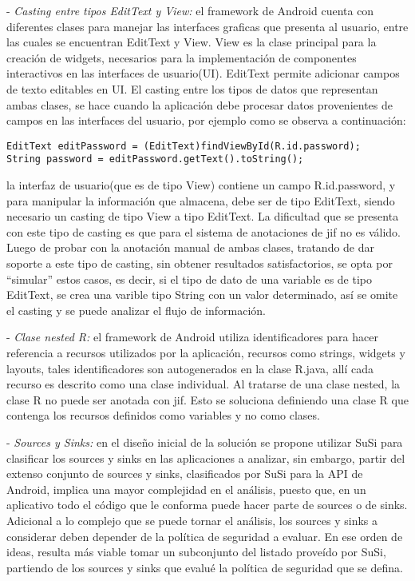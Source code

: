 - \textit{Casting entre tipos EditText y View:}\newline
el framework de Android cuenta con diferentes clases para manejar las interfaces
graficas que presenta al usuario, entre las cuales se encuentran EditText y
View. View es la clase principal para la creación de widgets, necesarios para la
implementación de componentes interactivos en las interfaces de usuario(UI).
EditText permite adicionar campos de texto editables en UI. El casting entre los
tipos de datos que representan ambas clases, se hace cuando la aplicación debe
procesar datos provenientes de campos en las interfaces del usuario, por ejemplo
como se observa a continuación:
\begin{lstlisting}
EditText editPassword = (EditText)findViewById(R.id.password);
String password = editPassword.getText().toString();
\end{lstlisting}
la interfaz de usuario(que es de tipo View) contiene un campo R.id.password, y
para manipular la información que almacena, debe ser de tipo EditText, siendo
necesario un casting de tipo View a tipo EditText. La dificultad que se presenta
con este tipo de casting es que para el sistema de anotaciones de jif no es
válido. Luego de probar con la anotación manual de ambas clases, tratando de
dar soporte a este tipo de casting, sin obtener resultados satisfactorios, se
opta por ``simular'' estos casos, es decir, si el tipo de dato de una variable
es de tipo EditText, se crea una varible tipo String con un valor determinado,
así se omite el casting y se puede analizar el flujo de información.\newline

- \textit{Clase nested R:}\newline
el framework de Android utiliza identificadores para hacer referencia a recursos
utilizados por la aplicación, recursos como strings, widgets y layouts, tales
identificadores son autogenerados en la clase R.java, allí cada recurso es
descrito como una clase individual. Al tratarse de una clase nested, la clase R
no puede ser anotada con jif. Esto se soluciona definiendo una clase R que
contenga los recursos definidos como variables y no como clases.

- \textit{Sources y Sinks:}\newline
en el diseño inicial de la solución se propone utilizar SuSi para clasificar
los sources y sinks en las aplicaciones a analizar, sin embargo, partir del
extenso conjunto de sources y sinks, clasificados por SuSi para la API de
Android, implica una mayor complejidad en el análisis, puesto que, en un
aplicativo todo el código que le conforma puede hacer parte de sources o de
sinks. Adicional a lo complejo que se puede tornar el análisis, los sources y
sinks a considerar deben depender de la política de seguridad a evaluar. En ese
orden de ideas, resulta más viable tomar un subconjunto del listado proveído por
SuSi, partiendo de los sources y sinks que evalué la política de seguridad que
se defina.

